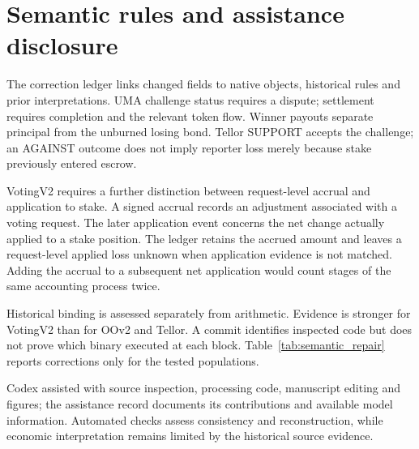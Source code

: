 \section{Semantic rules and assistance disclosure}
\label{app:semantics}

The correction ledger links changed fields to native objects, historical rules and prior interpretations. UMA challenge status requires a dispute; settlement requires completion and the relevant token flow. Winner payouts separate principal from the unburned losing bond. Tellor SUPPORT accepts the challenge; an AGAINST outcome does not imply reporter loss merely because stake previously entered escrow.

VotingV2 requires a further distinction between request-level accrual and application to stake. A signed accrual records an adjustment associated with a voting request. The later application event concerns the net change actually applied to a stake position. The ledger retains the accrued amount and leaves a request-level applied loss unknown when application evidence is not matched. Adding the accrual to a subsequent net application would count stages of the same accounting process twice.

Historical binding is assessed separately from arithmetic. Evidence is stronger for VotingV2 than for OOv2 and Tellor. A commit identifies inspected code but does not prove which binary executed at each block. Table~\ref{tab:semantic_repair} reports corrections only for the tested populations.

Codex assisted with source inspection, processing code, manuscript editing and figures; the assistance record documents its contributions and available model information. Automated checks assess consistency and reconstruction, while economic interpretation remains limited by the historical source evidence.
